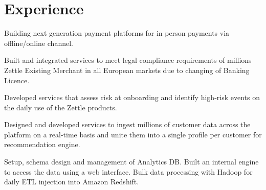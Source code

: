 \documentclass[]{rajnikant-resume-openfont}
\begin{document}
\hfill
\begin{minipage}[t]{0.66\textwidth} 


\section{Experience}

\begin{tightemize}
	
	\item  {} Building next generation payment platforms for in person payments via offline/online channel. 
\end{tightemize}
\sectionsep

\begin{tightemize}

\item  {} Built and integrated services to meet legal compliance requirements of ​millions ​Zettle​ ​Existing Merchant in all European markets due to changing of Banking Licence.  
\item  {} Developed services that assess risk at onboarding and identify high-risk events on the daily use of the Zettle products.
\end{tightemize}
\sectionsep

\begin{tightemize}
\item {}  Designed and developed services to ingest millions of customer data across the platform on a
real-time basis and unite them into a single profile per customer for recommendation engine.
\item {} Setup, schema design and management of Analytics DB. Built an internal engine to
access the data using a web interface. Bulk data processing with Hadoop for daily ETL injection into Amazon Redshift.


\end{tightemize}
\end{minipage}
\end{document}
